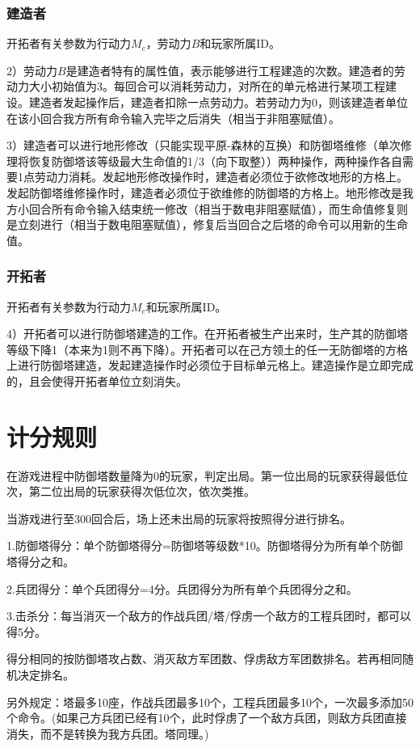 \documentclass[a4paper,4pt]{article}
\begin{document}
\subsubsection{建造者}
开拓者有关参数为行动力$M_c$，劳动力$B$和玩家所属ID。\par
2）劳动力$B$是建造者特有的属性值，表示能够进行工程建造的次数。建造者的劳动力大小初始值为3。每回合可以消耗劳动力，对所在的单元格进行某项工程建设。建造者发起操作后，建造者扣除一点劳动力。若劳动力为0，则该建造者单位在该小回合我方所有命令输入完毕之后消失（相当于非阻塞赋值）。\par %
3）建造者可以进行地形修改（只能实现平原-森林的互换）和防御塔维修（单次修理将恢复防御塔该等级最大生命值的1/3（向下取整））两种操作，两种操作各自需要1点劳动力消耗。发起地形修改操作时，建造者必须位于欲修改地形的方格上。发起防御塔维修操作时，建造者必须位于欲维修的防御塔的方格上。地形修改是我方小回合所有命令输入结束统一修改（相当于数电非阻塞赋值），而生命值修复则是立刻进行（相当于数电阻塞赋值），修复后当回合之后塔的命令可以用新的生命值。
\subsubsection{开拓者}
开拓者有关参数为行动力$M_c$和玩家所属ID。\par
4）开拓者可以进行防御塔建造的工作。在开拓者被生产出来时，生产其的防御塔等级下降1（本来为1则不再下降）。开拓者可以在己方领土的任一无防御塔的方格上进行防御塔建造，发起建造操作时必须位于目标单元格上。建造操作是立即完成的，且会使得开拓者单位立刻消失。


\section{计分规则}
在游戏进程中防御塔数量降为0的玩家，判定出局。第一位出局的玩家获得最低位次，第二位出局的玩家获得次低位次，依次类推。\par
当游戏进行至300回合后，场上还未出局的玩家将按照得分进行排名。\par
1.防御塔得分：单个防御塔得分=防御塔等级数*10。防御塔得分为所有单个防御塔得分之和。\par
2.兵团得分：单个兵团得分=4分。兵团得分为所有单个兵团得分之和。\par
3.击杀分：每当消灭一个敌方的作战兵团/塔/俘虏一个敌方的工程兵团时，都可以得5分。\par
得分相同的按防御塔攻占数、消灭敌方军团数、俘虏敌方军团数排名。若再相同随机决定排名。\par
另外规定：塔最多10座，作战兵团最多10个，工程兵团最多10个，一次最多添加50个命令。(如果己方兵团已经有10个，此时俘虏了一个敌方兵团，则敌方兵团直接消失，而不是转换为我方兵团。塔同理。)
\end{document}
